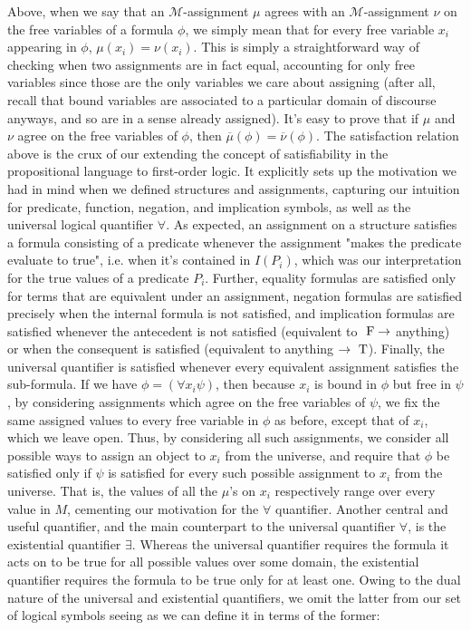 \documentclass{article}
\begin{document}
Above, when we say that an $ \mathcal{M} $-assignment $ \mu $ agrees with an $ \mathcal{M} $-assignment $ \nu $ on the free variables of a formula $ \phi $, we simply mean that for every free variable $ x_i $ appearing in $ \phi $, $ \mu(x_i) = \nu(x_i) $. This is simply a straightforward way of checking when two assignments are in fact equal, accounting for only free variables since those are the only variables we care about assigning (after all, recall that bound variables are associated to a particular domain of discourse anyways, and so are in a sense already assigned). It's easy to prove that if $ \mu $ and $ \nu $ agree on the free variables of $ \phi $, then $ \overline{\mu}(\phi) = \overline{\nu}(\phi) $.
\nn
The satisfaction relation above is the crux of our extending the concept of satisfiability in the propositional language to first-order logic. It explicitly sets up the motivation we had in mind when we defined structures and assignments, capturing our intuition for predicate, function, negation, and implication symbols, as well as the universal logical quantifier $ \forall $. As expected, an assignment on a structure satisfies a formula consisting of a predicate whenever the assignment "makes the predicate evaluate to true", i.e. when it's contained in $ I(P_i) $, which was our interpretation for the true values of a predicate $ P_i $. Further, equality formulas are satisfied only for terms that are equivalent under an assignment, negation formulas are satisfied precisely when the internal formula is not satisfied, and implication formulas are satisfied whenever the antecedent is not satisfied (equivalent to $ \text{\normalfont\ F} \rightarrow $ anything) or when the consequent is satisfied (equivalent to anything $ \rightarrow \text{\normalfont\ T} $). Finally, the universal quantifier is satisfied whenever every equivalent assignment satisfies the sub-formula. If we have $ \phi = (\forall x_i \psi) $, then because $ x_i $ is bound in $ \phi $ but free in $ \psi $, by considering assignments which agree on the free variables of $ \psi $, we fix the same assigned values to every free variable in $ \phi $ as before, except that of $ x_i $, which we leave open. Thus, by considering all such assignments, we consider all possible ways to assign an object to $ x_i $ from the universe, and require that $ \phi $ be satisfied only if $ \psi $ is satisfied for every such possible assignment to $ x_i $ from the universe. That is, the values of all the $ \mu $'s on $ x_i $ respectively range over every value in $ M $, cementing our motivation for the $ \forall $ quantifier.
\nn
Another central and useful quantifier, and the main counterpart to the universal quantifier $ \forall $, is the existential quantifier $ \exists $. Whereas the universal quantifier requires the formula it acts on to be true for all possible values over some domain, the existential quantifier requires the formula to be true only for at least one. Owing to the dual nature of the universal and existential quantifiers, we omit the latter from our set of logical symbols seeing as we can define it in terms of the former:
\end{document}
